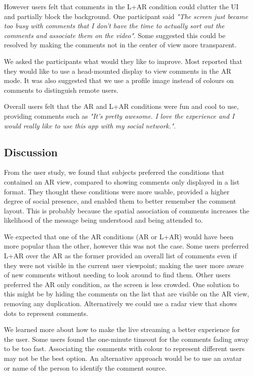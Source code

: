 However users felt that comments in the L+AR condition could clutter the UI and partially block the background. One participant said \textit{"The screen just became too busy with comments that I don't have the time to actually sort out the comments and associate them on the video"}. Some suggested this could be resolved by making the comments not in the center of view more transparent.
 
We asked the participants what would they like to improve. Most reported that they would like to use a head-mounted display to view comments in the AR mode.  It was also suggested that we use a profile image instead of colours on comments to distinguish remote users.
 
Overall users felt that the AR and L+AR conditions were fun and cool to use, providing comments such as \textit{"It's pretty awesome. I love the experience and I would really like to use this app with my social network."}.


\subsection{Discussion}

From the user study, we found that subjects preferred the conditions that contained an AR view, compared to showing comments only displayed in a list format. They thought these conditions were more usable, provided a higher degree of social presence, and enabled them to better remember the comment layout. This is probably because the spatial association of comments increases the likelihood of the message being understood and being attended to.

We expected that one of the AR conditions (AR or L+AR) would have been more popular than the other, however this was not the case. Some users preferred L+AR over the AR as the former provided an overall list of comments even if they were not visible in the current user viewpoint; making the user more aware of new comments without needing to look around to find them. Other users preferred the AR only condition, as the screen is less crowded. One solution to this might be by hiding the comments on the list that are visible on the AR view, removing any duplication. Alternatively we could use a radar view that shows dots to represent comments. 

We learned more about how to make the live streaming a better experience for the user. Some users found the one-minute timeout for the comments fading away to be too fast. Associating the comments with colour to represent different users may not be the best option. An alternative approach would be to use an avatar or name of the person to identify the comment source. 

